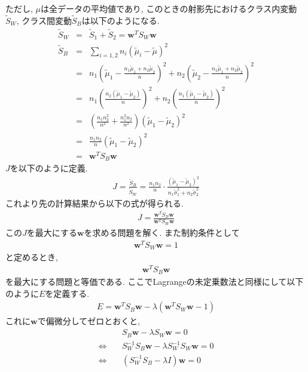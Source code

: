 \documentclass[dvipdfmx,a4j]{jsarticle}
\begin{document}
  ただし, $\mu$は全データの平均値であり, このときの射影先におけるクラス内変動$\tilde{S}_{W}$, クラス間変動$\tilde{S}_{B}$は以下のようになる.
  \begin{eqnarray*}
    \tilde{S}_{W}&=&\tilde{S}_{1}+\tilde{S}_{2}=\bm{w}^{T}S_{W}\bm{w}\\
    \tilde{S}_{B}&=&\sum_{i=1,2}n_{i}(\tilde{\mu}_{i}-\tilde{\mu})^{2}\\
                 &=&n_{1}\left(\tilde{\mu}_{1}-\frac{n_{1}\tilde{\mu}_{1}+n_{2}\tilde{\mu}_{2}}{n}\right)^{2}+n_{2}\left(\tilde{\mu}_{2}-\frac{n_{1}\tilde{\mu}_{1}+n_{2}\tilde{\mu}_{2}}{n}\right)^{2}\\
                 &=&n_{1}\left(\frac{n_{2}(\tilde{\mu}_{1}-\tilde{\mu}_{2})}{n}\right)^{2}+n_{2}\left(\frac{n_{1}(\tilde{\mu}_{1}-\tilde{\mu}_{2})}{n}\right)^{2}\\
                 &=&\left(\frac{n_{1}n_{2}^{2}}{n^{2}}+\frac{n_{1}^{2}n_{2}}{n^{2}}\right)(\tilde{\mu}_{1}-\tilde{\mu}_{2})^{2}\\
                 &=&\frac{n_{1}n_{2}}{n}(\tilde{\mu}_{1}-\tilde{\mu}_{2})^{2}\\
                 &=&\bm{w}^{T}S_{B}\bm{w}
  \end{eqnarray*}
  $J$を以下のように定義.
  \begin{align*}
    J=\frac{\tilde{S}_{B}}{\tilde{S}_{W}}=\frac{n_{1}n_{2}}{n}\cdot \frac{(\tilde{\mu}_{1}-\tilde{\mu}_{2})^{2}}{n_{1}\tilde{\sigma}_{1}^{2}+n_{2}\tilde{\sigma}_{2}^{2}} \tag{6.5}
  \end{align*}
  これより先の計算結果から以下の式が得られる.
  \begin{eqnarray*}
    J=\frac{\bm{w}^{T}S_{B}\bm{w}}{\bm{w}^{T}S_{W}\bm{w}}
  \end{eqnarray*}
  この$J$を最大にする$\bm{w}$を求める問題を解く. また制約条件として
  \begin{eqnarray*}
    \bm{w}^{T}S_{W}\bm{w}=1
  \end{eqnarray*}
  と定めるとき,
  \begin{eqnarray*}
    \bm{w}^{T}S_{B}\bm{w}
  \end{eqnarray*}
  を最大にする問題と等価である.
  ここでLagrangeの未定乗数法と同様にして以下のように$E$を定義する.
  \begin{eqnarray*}
    E=\bm{w}^{T}S_{B}\bm{w}-\lambda(\bm{w}^{T}S_{W}\bm{w}-1)
  \end{eqnarray*}
  これに$\bm{w}$で偏微分してゼロとおくと,
  \begin{eqnarray*}
    &&S_{B}\bm{w}-\lambda S_{W}\bm{w}=0\\
    \Longleftrightarrow\ && S_{W}^{-1}S_{B}\bm{w}-\lambda S_{W}^{-1}S_{W}\bm{w}=0\\
    \Longleftrightarrow\ && (S_{W}^{-1}S_{B}-\lambda I)\bm{w}=0
  \end{eqnarray*}
\end{document}
